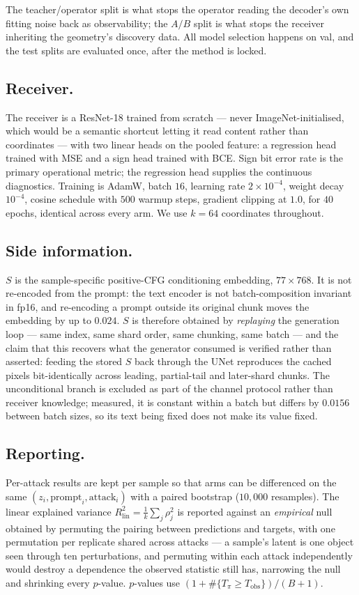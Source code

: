 \documentclass{article}
\theoremstyle{definition}
\begin{document}
The teacher/operator split is what stops the operator reading the decoder's own fitting
noise back as observability; the $A/B$ split is what stops the receiver inheriting the
geometry's discovery data. All model selection happens on val, and the test splits are
evaluated once, after the method is locked.

\subsection*{Receiver.}
The receiver is a ResNet-18 trained from scratch --- never ImageNet-initialised, which
would be a semantic shortcut letting it read content rather than coordinates --- with two
linear heads on the pooled feature: a regression head trained with MSE and a sign head
trained with BCE. Sign bit error rate is the primary operational metric; the regression
head supplies the continuous diagnostics. Training is AdamW, batch $16$, learning rate
$2\times10^{-4}$, weight decay $10^{-4}$, cosine schedule with $500$ warmup steps,
gradient clipping at $1.0$, for $40$ epochs, identical across every arm. We use $k=64$
coordinates throughout.

\subsection*{Side information.}
$S$ is the sample-specific positive-CFG conditioning embedding, $77\times768$. It is not
re-encoded from the prompt: the text encoder is not batch-composition invariant in fp16,
and re-encoding a prompt outside its original chunk moves the embedding by up to
$0.024$. $S$ is therefore obtained by \emph{replaying} the generation loop --- same index,
same shard order, same chunking, same batch --- and the claim that this recovers what the
generator consumed is verified rather than asserted: feeding the stored $S$ back through
the UNet reproduces the cached pixels bit-identically across leading, partial-tail and
later-shard chunks. The unconditional branch is excluded as part of the channel protocol
rather than receiver knowledge; measured, it is constant within a batch but differs by
$0.0156$ between batch sizes, so its text being fixed does not make its value fixed.

\subsection*{Reporting.}
Per-attack results are kept per sample so that arms can be differenced on the same
$(z_i,\text{prompt}_i,\text{attack}_i)$ with a paired bootstrap ($10{,}000$ resamples).
The linear explained variance $R^2_{\mathrm{lin}}=\frac1k\sum_j\rho_j^2$ is reported
against an \emph{empirical} null obtained by permuting the pairing between predictions and
targets, with one permutation per replicate shared across attacks --- a sample's latent is
one object seen through ten perturbations, and permuting within each attack independently
would destroy a dependence the observed statistic still has, narrowing the null and
shrinking every $p$-value. $p$-values use $(1+\#\{T_\pi\ge T_{\mathrm{obs}}\})/(B+1)$.
\end{document}
